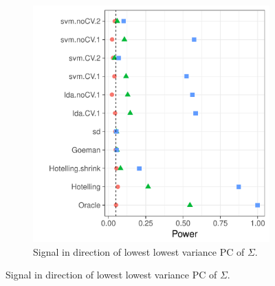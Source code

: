 \documentclass[12pt,a4paper]{article}
\begin{document}
\begin{figure}[h]
\begin{subfigure}[t]{.4\textwidth}
		\includegraphics[width=1\linewidth]{"art/file23"}
		\caption{Signal in direction of lowest lowest variance PC of $\Sigma$.} 
		\label{fig:dependence_22}
	\end{subfigure}
\end{figure}
\end{document}
